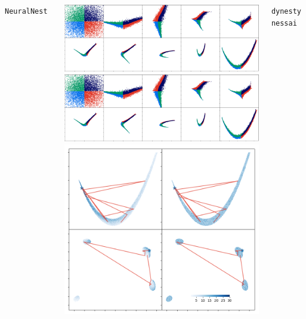 \documentclass[aspectratio=169]{beamer}
\begin{document}
\begin{frame}
\begin{columns}[t]
        \vfill
        \texttt{NeuralNest}~
        \begin{columns}
            \includegraphics[width=\textwidth]{figures/rosenbrock_flow.png}
            \includegraphics[width=\textwidth]{figures/himmelblau_flow.png}
            \includegraphics[width=\textwidth]{figures/chains.png}
        \end{columns}
        \texttt{dynesty}~ \texttt{nessai}~
        \vfill

\end{columns}
\end{frame}
\end{document}
